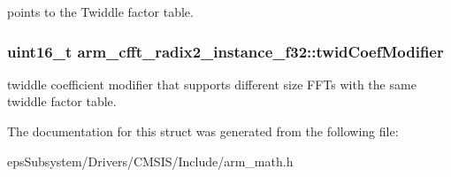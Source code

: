 points to the Twiddle factor table. \hypertarget{structarm__cfft__radix2__instance__f32_a411f75b6ed01690293f4f5988030ea42}{
\subsubsection[{twid\-Coef\-Modifier}]{\setlength{\rightskip}{0pt plus 5cm}uint16\-\_\-t arm\-\_\-cfft\-\_\-radix2\-\_\-instance\-\_\-f32\-::twid\-Coef\-Modifier}}\label{structarm__cfft__radix2__instance__f32_a411f75b6ed01690293f4f5988030ea42}
twiddle coefficient modifier that supports different size F\-F\-Ts with the same twiddle factor table. 

The documentation for this struct was generated from the following file\-:\begin{DoxyCompactItemize}
\item 
eps\-Subsystem/\-Drivers/\-C\-M\-S\-I\-S/\-Include/arm\-\_\-math.\-h\end{DoxyCompactItemize}
